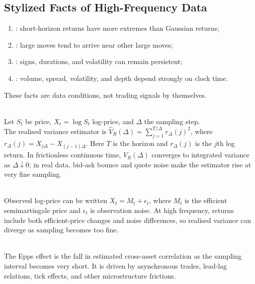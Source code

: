 \subsection{Stylized Facts of High-Frequency Data}

\begin{taxonomy} 
\begin{enumerate}[label=\roman*.]
\setlength{\itemsep}{0pt}
\item {}: short-horizon returns have more extremes than Gaussian returns;
\item {}: large moves tend to arrive near other large moves;
\item {}: signs, durations, and volatility can remain persistent;
\item {}: volume, spread, volatility, and depth depend strongly on clock time.
\end{enumerate}
These facts are data conditions, not trading signals by themselves.
\end{taxonomy}

\begin{model} \\
Let $S_t$ be price, $X_t=\log S_t$ log-price, and $\Delta$ the sampling step.\\
The realised variance estimator is $\hat{V}_R(\Delta)=\sum\limits_{j=1}^{T/\Delta}r_\Delta(j)^2$, where $r_\Delta(j)=X_{j\Delta}-X_{(j-1)\Delta}$. Here $T$ is the horizon and $r_\Delta(j)$ is the $j$th log return. In frictionless continuous time, $\hat{V}_R(\Delta)$ converges to integrated variance as $\Delta\downarrow0$; in real data, bid-ask bounce and quote noise make the estimator rise at very fine sampling.
\end{model}

\begin{mechanism} \\
Observed log-price can be written $X_t=M_t+\epsilon_t$, where $M_t$ is the efficient semimartingale price and $\epsilon_t$ is observation noise. At high frequency, returns include both efficient-price changes and noise differences, so realised variance can diverge as sampling becomes too fine.
\end{mechanism}

\begin{definition} \\
The Epps effect is the fall in estimated cross-asset correlation as the sampling interval becomes very short. It is driven by asynchronous trades, lead-lag relations, tick effects, and other microstructure frictions.
\end{definition}

